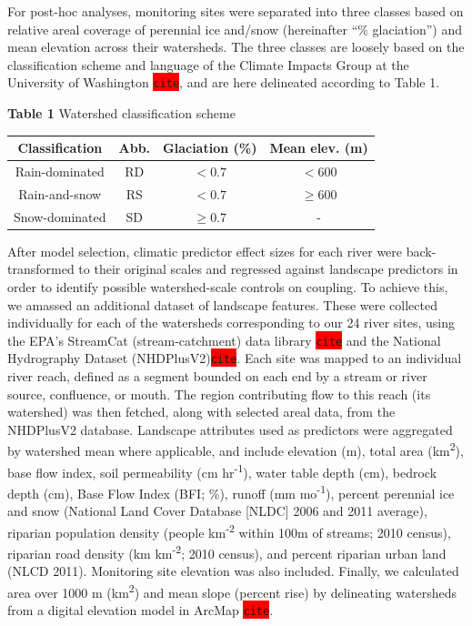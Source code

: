 \documentclass[notitlepage]{article}
\begin{document}
For post-hoc analyses, monitoring sites were separated into three classes based on relative areal coverage of perennial ice and/snow (hereinafter ``\% glaciation'') and mean elevation across their watersheds. The three classes are loosely based on the classification scheme and language of the Climate Impacts Group at the University of Washington \colorbox{red}{\lstinline{cite}}, and are here delineated according to Table 1.

\begin{center}
\textbf{Table 1} Watershed classification scheme
\end{center}
\begin{center}
\begin{tabular}{ |c|c|c|c| }
 \hline
 Classification & Abb. & Glaciation (\%) & Mean elev. (m) \\
 \hline
 Rain-dominated & RD & $< 0.7$ & $< 600$ \\
 Rain-and-snow & RS & $< 0.7$ & $\geq 600$ \\
 Snow-dominated & SD & $\geq 0.7$ & - \\
 \hline
\end{tabular}
\end{center}

After model selection, climatic predictor effect sizes for each river were back-transformed to their original scales and regressed against landscape predictors in order to identify possible watershed-scale controls on coupling. To achieve this, we amassed an additional dataset of landscape features. These were collected individually for each of the watersheds corresponding to our 24 river sites, using the EPA's StreamCat (stream-catchment) data library \colorbox{red}{\lstinline{cite}} and the National Hydrography Dataset (NHDPlusV2)\colorbox{red}{\lstinline{cite}}. Each site was mapped to an individual river reach, defined as a segment bounded on each end by a stream or river source, confluence, or mouth. The region contributing flow to this reach (its watershed) was then fetched, along with selected areal data, from the NHDPlusV2 database. Landscape attributes used as predictors were aggregated by watershed mean where applicable, and include elevation (m), total area (km\textsuperscript{2}), base flow index, soil permeability (cm hr\textsuperscript{-1}), water table depth (cm), bedrock depth (cm), Base Flow Index (BFI; \%), runoff (mm mo\textsuperscript{-1}), percent perennial ice and snow (National Land Cover Database [NLDC] 2006 and 2011 average), riparian population density (people km\textsuperscript{-2} within 100m of streams; 2010 census), riparian road density (km km\textsuperscript{-2}; 2010 census), and percent riparian urban land (NLCD 2011). Monitoring site elevation was also included. Finally, we calculated area over 1000 m (km\textsuperscript{2}) and mean slope (percent rise) by delineating watersheds from a digital elevation model in ArcMap \colorbox{red}{\lstinline{cite}}.
\end{document}

